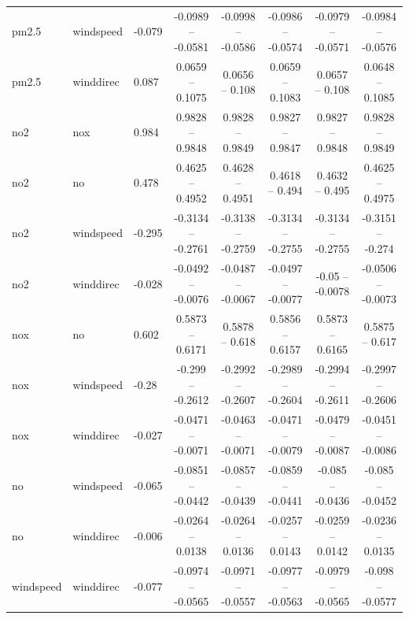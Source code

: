 \documentclass{beamer}
\begin{document}
\begin{frame}
{\begin{tabular}{lllccccc}
      pm2.5     & windspeed & -0.079 & -0.0989 -- -0.0581 & -0.0998 -- -0.0586 & -0.0986 -- -0.0574 & -0.0979 -- -0.0571 & -0.0984 -- -0.0576 \\
      pm2.5     & winddirec & 0.087  & 0.0659  -- 0.1075  & 0.0656  -- 0.108   & 0.0659  -- 0.1083  & 0.0657  -- 0.108   & 0.0648  -- 0.1085 \\
      no2       & nox       & 0.984  & 0.9828  -- 0.9848  & 0.9828  -- 0.9849  & 0.9827  -- 0.9847  & 0.9827  -- 0.9848  & 0.9828  -- 0.9849 \\
      no2       & no        & 0.478  & 0.4625  -- 0.4952  & 0.4628  -- 0.4951  & 0.4618  -- 0.494   & 0.4632  -- 0.495   & 0.4625  -- 0.4975 \\
      no2       & windspeed & -0.295 & -0.3134 -- -0.2761 & -0.3138 -- -0.2759 & -0.3134 -- -0.2755 & -0.3134 -- -0.2755 & -0.3151 -- -0.274 \\
      no2       & winddirec & -0.028 & -0.0492 -- -0.0076 & -0.0487 -- -0.0067 & -0.0497 -- -0.0077 & -0.05   -- -0.0078 & -0.0506 -- -0.0073 \\
      nox       & no        & 0.602  & 0.5873  -- 0.6171  & 0.5878  -- 0.618   & 0.5856  -- 0.6157  & 0.5873  -- 0.6165  & 0.5875  -- 0.617   \\
      nox       & windspeed & -0.28  & -0.299  -- -0.2612 & -0.2992 -- -0.2607 & -0.2989 -- -0.2604 & -0.2994 -- -0.2611 & -0.2997 -- -0.2606 \\
      nox       & winddirec & -0.027 & -0.0471 -- -0.0071 & -0.0463 -- -0.0071 & -0.0471 -- -0.0079 & -0.0479 -- -0.0087 & -0.0451 -- -0.0086 \\
      no        & windspeed & -0.065 & -0.0851 -- -0.0442 & -0.0857 -- -0.0439 & -0.0859 -- -0.0441 & -0.085  -- -0.0436 & -0.085  -- -0.0452 \\
      no        & winddirec & -0.006 & -0.0264 -- 0.0138  & -0.0264 -- 0.0136  & -0.0257 -- 0.0143  & -0.0259 -- 0.0142  & -0.0236 -- 0.0135  \\
      windspeed & winddirec & -0.077 & -0.0974 -- -0.0565 & -0.0971 -- -0.0557 & -0.0977 -- -0.0563 & -0.0979 -- -0.0565 & -0.098  -- -0.0577 \\
    \end{tabular}
  }
\end{frame}
\end{document}
